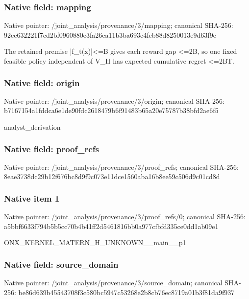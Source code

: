 \documentclass[10pt,a4paper]{article}
\begin{document}
\subsubsection{Native field: mapping}
Native pointer: /joint\_\allowbreak{}analysis/provenance/3/mapping; canonical SHA-256: 92cc632221f7cd2bf0960880e3fa26ea11b3ba693c4feb88d8250013e9d63f9e

\begingroup\raggedright\sloppy The retained premise |f\_\allowbreak{}t(x)|<=\allowbreak{}B gives each reward gap <=\allowbreak{}2B,\allowbreak{} so one fixed feasible policy independent of V\_\allowbreak{}H has expected cumulative regret <=\allowbreak{}2BT.\par\endgroup

\subsubsection{Native field: origin}
Native pointer: /joint\_\allowbreak{}analysis/provenance/3/origin; canonical SHA-256: b7167154a1fddca6e1de90fdc2618479b6f91483b65a20e75787b38bfd2ae6f5

\begingroup\raggedright\sloppy analyst\_\allowbreak{}derivation\par\endgroup

\subsubsection{Native field: proof\_\allowbreak{}refs}
Native pointer: /joint\_\allowbreak{}analysis/provenance/3/proof\_\allowbreak{}refs; canonical SHA-256: 8eae3738dc29b12f676bc8d9f9c073e11dce1560aba16b8ee59c506d9c01cd8d

\subsubsection{Native item 1}
Native pointer: /joint\_\allowbreak{}analysis/provenance/3/proof\_\allowbreak{}refs/0; canonical SHA-256: a5bbf6633f794b5b5cc70b4b41ff2d5461816bb0a977cfbfd335ce0dd1ab09e1

\begingroup\raggedright\sloppy ONX\_\allowbreak{}KERNEL\_\allowbreak{}MATERN\_\allowbreak{}H\_\allowbreak{}UNKNOWN\_\allowbreak{}\_\allowbreak{}main\_\allowbreak{}\_\allowbreak{}p1\par\endgroup

\subsubsection{Native field: source\_\allowbreak{}domain}
Native pointer: /joint\_\allowbreak{}analysis/provenance/3/source\_\allowbreak{}domain; canonical SHA-256: be86d639b45543708f3c580bc5947c53268e2b8cb76ec8719a01b3f81da9f937
\end{document}
